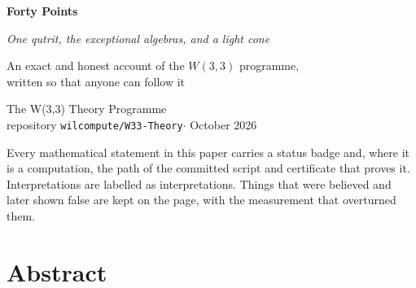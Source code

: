 \documentclass[11pt,twoside]{article}
\theoremstyle{plain}
\theoremstyle{definition}
\theoremstyle{remark}
\begin{document}
\pagecolor{paper}

\begin{titlepage}
\thispagestyle{empty}
\centering
\vspace*{8mm}

\vspace{12mm}
{\sffamily\fontsize{30}{36}\selectfont\bfseries\color{ink} Forty Points\par}
\vspace{4mm}
{\Large\itshape\color{teal} One qutrit, the exceptional algebras, and a light cone\par}
\vspace{9mm}
{\large An exact and honest account of the $W(3,3)$ programme,\\
written so that anyone can follow it\par}
\vspace{12mm}
{\sffamily\color{slate} The W(3,3) Theory Programme\\[2pt]
\small repository \texttt{wilcompute/W33-Theory}\quad$\cdot$ October 2026\par}
\vfill
\begin{minipage}{0.86\textwidth}\small\color{slate}
Every mathematical statement in this paper carries a status badge and, where it is
a computation, the path of the committed script and certificate that proves it.
Interpretations are labelled as interpretations. Things that were believed and later
shown false are kept on the page, with the measurement that overturned them.
\end{minipage}
\vspace{6mm}
\end{titlepage}

\thispagestyle{empty}
\section*{Abstract}
\end{document}
